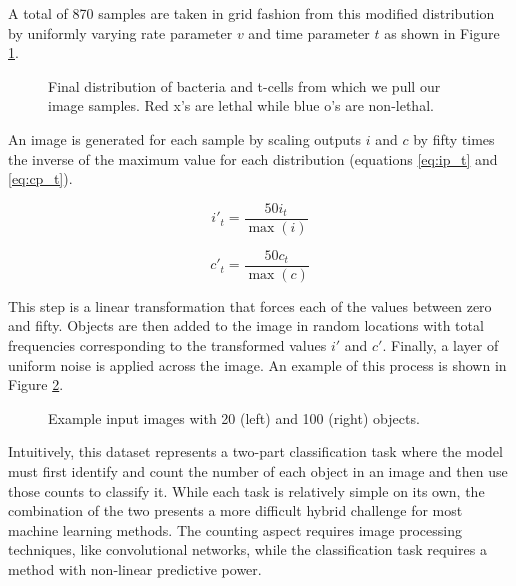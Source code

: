 A total of 870 samples are taken in grid fashion from this modified distribution by uniformly varying rate parameter $v$ and time parameter $t$ as shown in Figure \ref{fig:pandemic_sample_distribution}. 

\begin{figure}
    
    \centering
    \caption{Final distribution of bacteria and t-cells from which we pull our image samples. Red x's are lethal while blue o's are non-lethal.}
    \label{fig:pandemic_sample_distribution}
\end{figure}

An image is generated for each sample by scaling outputs $i$ and $c$ by fifty times the inverse of the maximum value for each distribution (equations \ref{eq:ip_t} and \ref{eq:cp_t}). 

\begin{equation}
    \label{eq:ip_t}
    i'_t = \frac{50 i_t}{\max(i)}
\end{equation}

\begin{equation}
    \label{eq:cp_t}
    c'_t = \frac{50 c_t}{\max(c)}
\end{equation}

This step is a linear transformation that forces each of the values between zero and fifty. Objects are then added to the image in random locations with total frequencies corresponding to the transformed values $i'$ and $c'$. Finally, a layer of uniform noise is applied across the image. An example of this process is shown in Figure \ref{fig:pandemic_sample_images}.

\begin{figure}
    \centering
    \begin{subfigure}{.5\textwidth}
      \centering
      
    \end{subfigure}%
    \begin{subfigure}{.5\textwidth}
      \centering
      
    \end{subfigure}
    \caption{Example input images with 20 (left) and 100 (right) objects.}
    \label{fig:pandemic_sample_images}
\end{figure}

Intuitively, this dataset represents a two-part classification task where the model must first identify and count the number of each object in an image and then use those counts to classify it. While each task is relatively simple on its own, the combination of the two presents a more difficult hybrid challenge for most machine learning methods. The counting aspect requires image processing techniques, like convolutional networks, while the classification task requires a method with non-linear predictive power.

